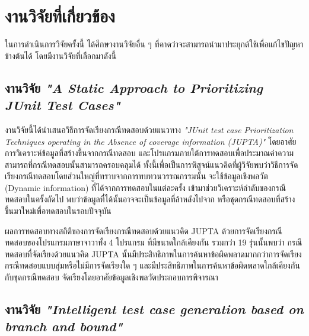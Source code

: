 \section{งานวิจัยที่เกี่ยวข้อง} 
\label{sec:related-work}

ในการดำเนินการวิจัยครั้งนี้ ได้ศึกษางานวิจัยอื่น ๆ ที่คาดว่าจะสามารถนำมาประยุกต์ใช้เพื่อแก้ไขปัญหาข้างต้นได้ โดยมีงานวิจัยที่เลือกมาดังนี้

\subsection{งานวิจัย {\it "A Static Approach to Prioritizing JUnit Test Cases"} \cite{6363461}}

งานวิจัยนี้ได้นำเสนอวิธีการจัดเรียงกรณีทดสอบด้วยแนวทาง \emph{"JUnit test case Prioritization Techniques operating in the Absence of coverage information (JUPTA)"} 
โดยอาศัยการวิเคราะห์ข้อมูล{\scg}ที่สร้างขึ้นจากกรณีทดสอบ และโปรแกรมภายใต้การทดสอบเพื่อประมาณค่าความสามารถที่กรณีทดสอบนั้นสามารถครอบคลุม{\sourcecode}ได้
ทั้งนี้เพื่อเป็นการพิสูจน์แนวคิดที่ผู้วิจัยพบว่าวิธีการจัดเรียงกรณีทดสอบโดยส่วนใหญ่ที่ทราบจากการทบทวนวรรณกรรมนั้น จะใช้ข้อมูลเชิงพลวัต (Dynamic information)
ที่ได้จากการทดสอบ{\sourcecode}ในแต่ละครั้ง เข้ามาช่วยวิเคราะห์ลำดับของกรณีทดสอบในครั้งถัดไป พบว่าข้อมูลที่ได้นั้นอาจจะเป็นข้อมูลที่ล้าหลังไปจาก{\sourcecode} 
หรือชุดกรณีทดสอบที่สร้างขึ้นมาใหม่เพื่อทดสอบในรอบปัจจุบัน 

ผลการทดสอบทางสถิติของการจัดเรียงกรณีทดสอบด้วยแนวคิด JUPTA ด้วยการจัดเรียงกรณีทดสอบของโปรแกรมภาษาจาวาทั้ง 4 โปรแกรม ที่มีขนาดใกล้เคียงกัน
รวมกว่า 19 รุ่นนั้นพบว่า กรณีทดสอบที่จัดเรียงด้วยแนวคิด JUPTA นั้นมีประสิทธิภาพในการค้นหาข้อผิดพลาดมากกว่าการจัดเรียงกรณีทดสอบแบบสุ่มหรือไม่มีการจัดเรียงใด ๆ 
และมีประสิทธิภาพในการค้นหาข้อผิดพลาดใกล้เคียงกันกับชุดกรณีทดสอบ จัดเรียงโดยอาศัยข้อมูลเชิงพลวัตประกอบการพิจารณา

\subsection{งานวิจัย {\it "Intelligent test case generation based on branch and bound"} \cite{XING201491}}
\label{sec:sub:bandb}

